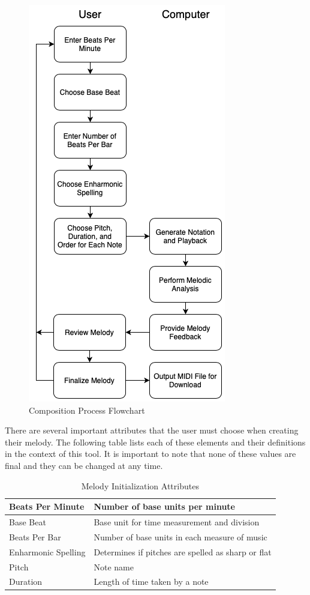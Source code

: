 \begin{figure}[!htbp]
	\centering
	\caption{Composition Process Flowchart}
	\includegraphics[scale=0.8]{images/composerProcess.png}
\end{figure}

\pagebreak

There are several important attributes that the user must choose when creating their melody.  The following table lists each of these elements and their definitions in the context of this tool.  It is important to note that none of these values are final and they can be changed at any time.

\begin{table}[!htbp]
	\centering
	\caption{Melody Initialization Attributes}
	\begin{tabular}{|l|l|}
		\hline
		Beats Per Minute & Number of base units per minute \\ \hline
		Base Beat & Base unit for time measurement and division \\ \hline
		Beats Per Bar & Number of base units in each measure of music \\ \hline
		Enharmonic Spelling & Determines if pitches are spelled as sharp or flat \\ \hline
		Pitch & Note name \\ \hline
		Duration & Length of time taken by a note \\ \hline
	\end{tabular}
\end{table}

